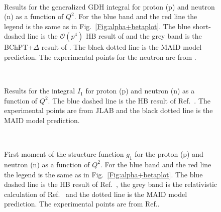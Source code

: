 \documentclass[prc,twocolumn,showpacs,preprintnumbers,amsmath,amssymb
,superscriptaddress,a4paper,nofootinbib
]{revtex4-1}
\begin{document}
\begin{figure}[t]
\begin{center}
\hspace{-0.3cm} \\
\hspace{-0.3cm} 
\caption{Results for the generalized GDH integral for proton (p) and neutron (n) as a function of $Q^2$. For the blue band and the red line the legend is the same as in Fig.~\ref{Fig:alpha+betaplot}. The blue short-dashed line is the $\mathcal{O}(p^4)$ HB result of \cite{Kao:2002cp,Kao:2003jd} and the grey band is the BChPT+$\Delta$ result of \cite{Bernard:2012hb}. The black dotted line is the MAID model prediction. The experimental points for the neutron are from \cite{Amarian:2002ar}.\label{Fig:IAplot}}
\end{center}
\end{figure}

\begin{figure}[t]
\begin{center}
\hspace{-0.3cm} \\
\hspace{-0.3cm} 
\caption{Results for the integral $I_1$ for proton (p) and neutron (n) as a function of $Q^2$. The blue dashed line is the HB result of Ref.~\cite{Kao:2003jd}. The experimental points are from JLAB and the black dotted line is the MAID model prediction.\label{Fig:I1plot}}
\end{center}
\end{figure}

\begin{figure}
\begin{center}
\hspace{-0.3cm} \\\hspace{-0.3cm} 
\caption{First moment of the structure function $g_1$ for the proton (p) and neutron (n) as a function of $Q^2$. For the blue band and the red line the legend is the same as in Fig.~\ref{Fig:alpha+betaplot}. The blue dashed line is the HB result of Ref.~\cite{Kao:2003jd}, the grey band is the relativistic calculation of Ref.~\cite{Bernard:2012hb} and the dotted line is the MAID model prediction. The experimental points are from Ref.\cite{Prok:2008ev}.\label{Fig:Gamma1plot}}
\end{center}
\end{figure}
\end{document}
